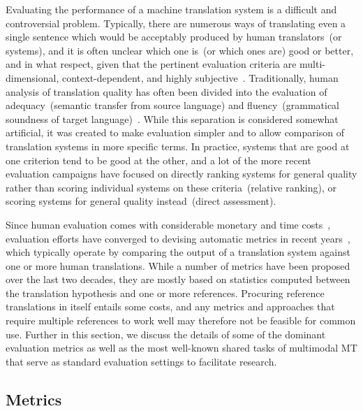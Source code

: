 \documentclass{svjour3}
\begin{document}
    Evaluating the performance of a machine translation system is a difficult and controversial problem. Typically, there are numerous ways of translating even a single sentence which would be acceptably produced by human translators~(or systems), and it is often unclear which one is~(or which ones are) good or better, and in what respect, given that the pertinent evaluation criteria are multi-dimensional, context-dependent, and highly subjective~\citep[see for example][]{chesterman-can-2002,drugan-quality-2013}. Traditionally, human analysis of translation quality has often been divided into the evaluation of adequacy~(semantic transfer from source language) and fluency~(grammatical soundness of target language)~\citep{doherty-human-2017}. While this separation is considered somewhat artificial, it was created to make evaluation simpler and 
to allow comparison of translation systems in more specific terms. In practice, systems that are good at one criterion tend to be good at the other, and a lot of the more recent evaluation campaigns have focused on directly ranking systems for general quality rather than scoring individual systems on these criteria~(relative ranking), or scoring systems for general quality instead~(direct assessment). 


    Since human evaluation comes with considerable monetary and time costs~\citep{castilho-approaches-2018}, evaluation efforts have converged to devising automatic metrics in recent years~\citep{ma-results-2018,ma-results-2019}, which typically operate by comparing the output of a translation system against one or more human translations.
While a number of metrics have been proposed over the last two decades, they are mostly based on statistics computed between the translation hypothesis and one or more references.
    Procuring reference translations in itself entails some costs, and any metrics and approaches that require multiple references to work well may therefore not be feasible for common use.
Further in this section, we discuss the details of some of the dominant evaluation metrics as well as the most well-known shared tasks of multimodal MT that serve as standard evaluation settings to facilitate research.




    \subsection{Metrics}
    \label{sec:eval:metrics}
        
\end{document}
